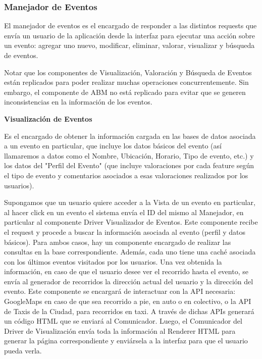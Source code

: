 \subsubsection{Manejador de Eventos}

El manejador de eventos es el encargado de responder a las distintos requests que envía un usuario de la aplicación desde la interfaz para ejecutar una acción sobre un evento: agregar uno nuevo, modificar, eliminar, valorar, visualizar y búsqueda de eventos.

Notar que los componentes de Visualización, Valoración y Búsqueda de Eventos están replicados para poder realizar muchas operaciones concurrentemente. Sin embargo, el componente de ABM no está replicado para evitar que se generen inconsistencias en la información de los eventos.

\textbf{Visualización de Eventos}

Es el encargado de obtener la información cargada en las bases de datos asociada a un evento en particular, que incluye los datos básicos del evento (así llamaremos a datos como el Nombre, Ubicación, Horario, Tipo de evento, etc.) y los datos del "Perfil del Evento" (que incluye valoraciones por cada feature según el tipo de evento y comentarios asociados a esas valoraciones realizados por los usuarios).

Supongamos que un usuario quiere acceder a la Vista de un evento en particular, al hacer click en un evento el sistema envía el ID del mismo al Manejador, en particular al componente Driver Visualizador de Eventos. Este componente recibe el request y procede a buscar la información asociada al evento (perfil y datos básicos). Para ambos casos, hay un componente encargado de realizar las consultas en la base correspondiente. Además, cada uno tiene una caché asociada con los últimos eventos visitados por los usuarios. Una vez obtenida la información, en caso de que el usuario desee ver el recorrido hasta el evento, se envía al generador de recorridos la dirección actual del usuario y la dirección del evento. Este componente se encargará de interactuar con la API necesaria: GoogleMaps en caso de que sea recorrido a pie, en auto o en colectivo, o la API de Taxis de la Ciudad, para recorridos en taxi. A través de dichas APIs generará un código HTML que se enviará al Comunicador. Luego, el Comunicador del Driver de Visualización envía toda la información al Renderer HTML para generar la página correspondiente y enviársela a la interfaz para que el usuario pueda verla.

